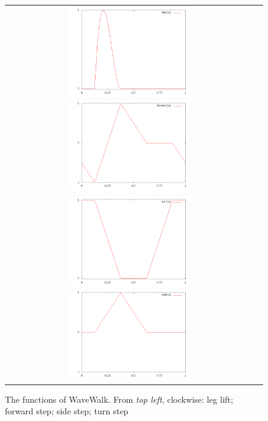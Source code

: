 \documentclass[pdftex,11pt,a4paper]{report}
\begin{document}
\begin{figure}[h]
    \begin{center}
        \begin{tabular}{cc}
            \includegraphics[width=0.5\textwidth]{figures/waveWalkLift}
            \includegraphics[width=0.5\textwidth]{figures/waveWalkForward}\\
            \includegraphics[width=0.5\textwidth]{figures/waveWalkTurn}
            \includegraphics[width=0.5\textwidth]{figures/waveWalkSide}
        \end{tabular}

    \end{center}
    \caption{The functions of WaveWalk. From \emph{top left}, clockwise:
    leg lift; forward step; side step; turn step}
    \label{fig:waveWalkFunctions}
\end{figure}
\end{document}
